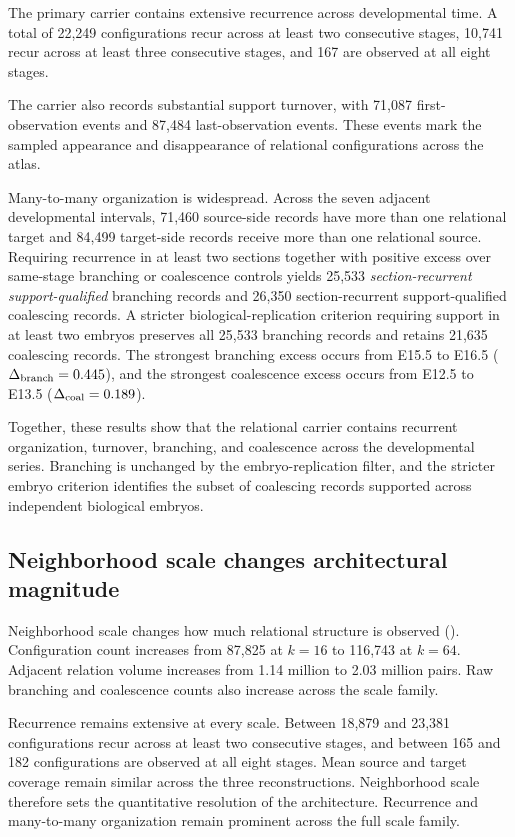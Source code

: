 \documentclass[11pt]{article}
\begin{document}
The primary carrier contains extensive recurrence across developmental time. A total of 22,249 configurations recur across at least two consecutive stages, 10,741 recur across at least three consecutive stages, and 167 are observed at all eight stages.

The carrier also records substantial support turnover, with 71,087 first-observation events and 87,484 last-observation events. These events mark the sampled appearance and disappearance of relational configurations across the atlas.

Many-to-many organization is widespread. Across the seven adjacent developmental intervals, 71,460 source-side records have more than one relational target and 84,499 target-side records receive more than one relational source. Requiring recurrence in at least two sections together with positive excess over same-stage branching or coalescence controls yields 25,533 \emph{section-recurrent support-qualified} branching records and 26,350 section-recurrent support-qualified coalescing records. A stricter biological-replication criterion requiring support in at least two embryos preserves all 25,533 branching records and retains 21,635 coalescing records. The strongest branching excess occurs from E15.5 to E16.5 ($\Delta_{\rm branch}=0.445$), and the strongest coalescence excess occurs from E12.5 to E13.5 ($\Delta_{\rm coal}=0.189$).

Together, these results show that the relational carrier contains recurrent organization, turnover, branching, and coalescence across the developmental series. Branching is unchanged by the embryo-replication filter, and the stricter embryo criterion identifies the subset of coalescing records supported across independent biological embryos.

\subsection{Neighborhood scale changes architectural magnitude}

Neighborhood scale changes how much relational structure is observed (). Configuration count increases from 87,825 at $k=16$ to 116,743 at $k=64$. Adjacent relation volume increases from 1.14 million to 2.03 million pairs. Raw branching and coalescence counts also increase across the scale family.

Recurrence remains extensive at every scale. Between 18,879 and 23,381 configurations recur across at least two consecutive stages, and between 165 and 182 configurations are observed at all eight stages. Mean source and target coverage remain similar across the three reconstructions. Neighborhood scale therefore sets the quantitative resolution of the architecture. Recurrence and many-to-many organization remain prominent across the full scale family.
\end{document}

